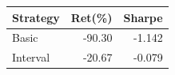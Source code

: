{\tiny\setlength{\tabcolsep}{2pt}\begin{tabular}{lrr} \toprule
Strategy & Ret(\%) & Sharpe \\ \midrule
Basic & -90.30 & -1.142 \\ 
Interval & -20.67 & -0.079 \\ 
\bottomrule \end{tabular}}